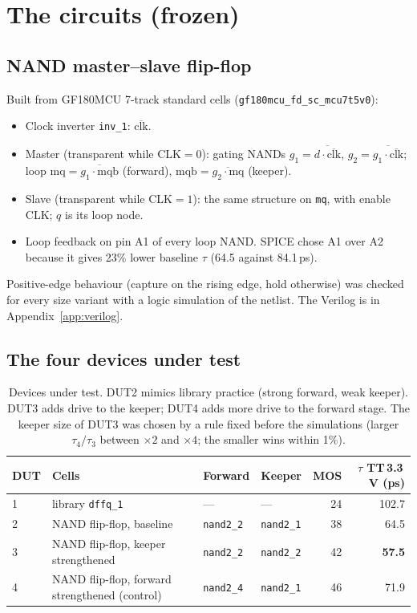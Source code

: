 \documentclass[11pt]{article}
\begin{document}
\section{The circuits (frozen)}
\subsection{NAND master--slave flip-flop}
Built from GF180MCU 7-track standard cells (\texttt{gf180mcu\_fd\_sc\_mcu7t5v0}):
\begin{itemize}
\item Clock inverter \texttt{inv\_1}: $\overline{\mathrm{clk}}$.
\item Master (transparent while CLK${}=0$): gating NANDs $g_1=\overline{d\cdot\overline{\mathrm{clk}}}$,
  $g_2=\overline{g_1\cdot\overline{\mathrm{clk}}}$; loop $\mathrm{mq}=\overline{g_1\cdot\mathrm{mqb}}$ (forward),
  $\mathrm{mqb}=\overline{g_2\cdot\mathrm{mq}}$ (keeper).
\item Slave (transparent while CLK${}=1$): the same structure on \texttt{mq}, with enable CLK; $q$ is its loop node.
\item Loop feedback on pin A1 of every loop NAND. SPICE chose A1 over A2 because it gives 23\% lower baseline
  $\tau$ (64.5 against 84.1\,ps).
\end{itemize}
Positive-edge behaviour (capture on the rising edge, hold otherwise) was checked for every size variant with a
logic simulation of the netlist. The Verilog is in Appendix~\ref{app:verilog}.

\subsection{The four devices under test}
\begin{table}[H]
\centering\small
\begin{tabular}{@{}llllrr@{}}
\toprule
DUT & Cells & Forward & Keeper & MOS & $\tau$ TT\,3.3\,V (ps) \\
\midrule
1 & library \texttt{dffq\_1} & --- & --- & 24 & 102.7 \\
2 & NAND flip-flop, baseline & \texttt{nand2\_2} & \texttt{nand2\_1} & 38 & 64.5 \\
3 & NAND flip-flop, keeper strengthened & \texttt{nand2\_2} & \texttt{nand2\_2} & 42 & \textbf{57.5} \\
4 & NAND flip-flop, forward strengthened (control) & \texttt{nand2\_4} & \texttt{nand2\_1} & 46 & 71.9 \\
\bottomrule
\end{tabular}
\caption{Devices under test. DUT2 mimics library practice (strong forward, weak keeper). DUT3 adds drive to the
keeper; DUT4 adds more drive to the forward stage. The keeper size of DUT3 was chosen by a rule fixed before the
simulations (larger $\tau_4/\tau_3$ between $\times2$ and $\times4$; the smaller wins within 1\%).}
\label{tab:duts}
\end{table}
\end{document}
